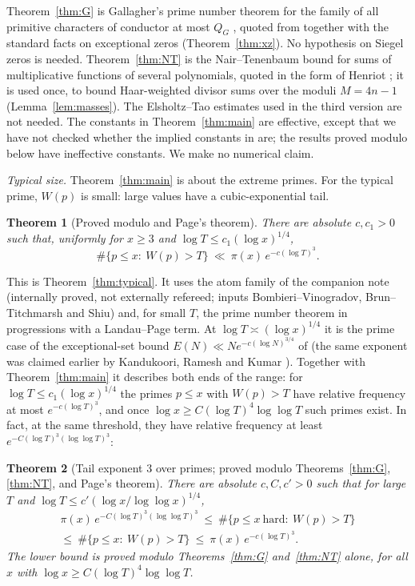 \documentclass[11pt,reqno]{amsart}
\newtheorem{theorem}{Theorem}[section]
\theoremstyle{definition}
\begin{document}
Theorem~\ref{thm:G} is Gallagher's prime number theorem for the family of
all primitive characters of conductor at most $Q_G$ \cite{Gallagher}, quoted
from \cite[Thm.~28.19]{MV3} together with the standard facts on exceptional
zeros (Theorem~\ref{thm:xz}).  No hypothesis on Siegel zeros is needed.
Theorem~\ref{thm:NT} is the Nair--Tenenbaum bound \cite{NT} for sums of
multiplicative functions of several polynomials, quoted in the form of
Henriot \cite{Henriot}; it is used once, to bound Haar-weighted divisor sums
over the moduli $M=4n-1$ (Lemma~\ref{lem:masses}).  The Elsholtz--Tao
estimates used in the third version are not needed.  The constants in
Theorem~\ref{thm:main} are effective, except that we have not checked whether
the implied constants in \cite{NT} are; the results proved modulo \cite{TQ}
below have ineffective constants.  We make no numerical claim.

\emph{Typical size.}  Theorem~\ref{thm:main} is about the extreme primes.  For
the typical prime, $W(p)$ is small: large values have a cubic-exponential
tail.

\begin{theorem}[Proved modulo \cite{TQ} and Page's theorem]\label{thm:typicalintro}
There are absolute $c,c_1>0$ such that, uniformly for $x\ge3$ and
$\log T\le c_1(\log x)^{1/4}$,
\[
 \#\{p\le x:\ W(p)>T\}\ \ll\ \pi(x)\,e^{-c(\log T)^3}.
\]
\end{theorem}

This is Theorem~\ref{thm:typical}.  It uses the atom family of the companion
note \cite{TQ} (internally proved, not externally refereed; inputs
Bombieri--Vinogradov, Brun--Titchmarsh and Shiu) and, for small $T$, the prime
number theorem in progressions with a Landau--Page term.  At
$\log T\asymp(\log x)^{1/4}$ it is the prime case of the exceptional-set bound
$E(N)\ll Ne^{-c(\log N)^{3/4}}$ of \cite{TQ} (the same exponent was claimed
earlier by Kandukoori, Ramesh and Kumar \cite{KRK}).  Together with
Theorem~\ref{thm:main} it describes both ends of the range: for
$\log T\le c_1(\log x)^{1/4}$ the primes $p\le x$ with $W(p)>T$ have relative frequency
at most $e^{-c(\log T)^3}$, and once $\log x\ge C(\log T)^4\log\log T$ such primes
exist.  In fact, at the same threshold, they have relative frequency at
least $e^{-C(\log T)^3(\log\log T)^3}$:

\begin{theorem}[Tail exponent $3$ over primes; proved modulo Theorems~\ref{thm:G}, \ref{thm:NT}, \cite{TQ} and Page's theorem]\label{thm:tailintro}
There are absolute $c,C,c'>0$ such that for large $T$ and
$\log T\le c'(\log x/\log\log x)^{1/4}$,
\begin{multline*}
 \pi(x)\,e^{-C(\log T)^3(\log\log T)^3}\ \le\ \#\{p\le x\ \text{hard}:\ W(p)>T\}\\
 \le\ \#\{p\le x:\ W(p)>T\}\ \le\ \pi(x)\,e^{-c(\log T)^3}.
\end{multline*}
The lower bound is proved modulo Theorems~\ref{thm:G} and~\ref{thm:NT} alone, for all
$x$ with $\log x\ge C(\log T)^4\log\log T$.
\end{theorem}
\end{document}

